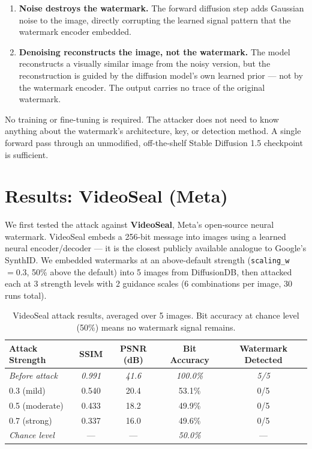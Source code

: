 \documentclass[11pt,a4paper]{article}
\begin{document}
\begin{enumerate}[leftmargin=2em]
  \item \textbf{Noise destroys the watermark.} The forward diffusion
    step adds Gaussian noise to the image, directly corrupting the
    learned signal pattern that the watermark encoder embedded.
  \item \textbf{Denoising reconstructs the image, not the watermark.}
    The model reconstructs a visually similar image from the noisy
    version, but the reconstruction is guided by the diffusion model's
    own learned prior --- not by the watermark encoder. The output
    carries no trace of the original watermark.
\end{enumerate}

No training or fine-tuning is required. The attacker does not need to
know anything about the watermark's architecture, key, or detection
method. A single forward pass through an unmodified, off-the-shelf
Stable Diffusion 1.5 checkpoint is sufficient.

\section{Results: VideoSeal (Meta)}

We first tested the attack against \textbf{VideoSeal}, Meta's
open-source neural watermark. VideoSeal embeds a 256-bit message into
images using a learned neural encoder/decoder --- it is the closest
publicly available analogue to Google's SynthID. We embedded watermarks
at an above-default strength (\texttt{scaling\_w}~$= 0.3$, 50\% above
the default) into 5 images from DiffusionDB, then attacked each at 3
strength levels with 2 guidance scales (6 combinations per image, 30
runs total).

\begin{table}[h]
\centering
\caption{VideoSeal attack results, averaged over 5 images. Bit accuracy
at chance level (50\%) means no watermark signal remains.}
\label{tab:videoseal}
\begin{tabular}{lcccc}
\toprule
\textbf{Attack Strength} & \textbf{SSIM} & \textbf{PSNR (dB)} &
\textbf{Bit Accuracy} & \textbf{Watermark Detected} \\
\midrule
\textit{Before attack} & \textit{0.991} & \textit{41.6} &
\textit{100.0\%} & \textit{5/5} \\
\midrule
0.3 (mild)     & 0.540 & 20.4 & 53.1\% & 0/5 \\
0.5 (moderate) & 0.433 & 18.2 & 49.9\% & 0/5 \\
0.7 (strong)   & 0.337 & 16.0 & 49.6\% & 0/5 \\
\midrule
\textit{Chance level} & --- & --- & \textit{50.0\%} & --- \\
\bottomrule
\end{tabular}
\end{table}
\end{document}
